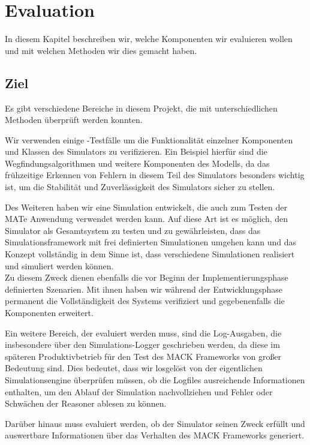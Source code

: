 \chapter{Evaluation}\label{chapter:eval}
In diesem Kapitel beschreiben wir, welche Komponenten wir evaluieren wollen und mit welchen Methoden wir dies gemacht haben.
\section{Ziel}\label{sec:eva_goal}
Es gibt verschiedene Bereiche in diesem Projekt, die mit unterschiedlichen Methoden überprüft werden konnten.

Wir verwenden einige -Testfälle um die Funktionalität einzelner Komponenten und Klassen des Simulators zu verifizieren. Ein Beispiel hierfür sind die Wegfindungsalgorithmen und weitere Komponenten des Modells, da das frühzeitige Erkennen von Fehlern in diesem Teil des Simulators besonders wichtig ist, um die Stabilität und Zuverlässigkeit des Simulators sicher zu stellen.

Des Weiteren haben wir eine Simulation entwickelt, die auch zum Testen der MATe Anwendung verwendet werden kann. Auf diese Art ist es möglich, den Simulator als Gesamtsystem zu testen und zu gewährleisten, dass das Simulationsframework mit frei definierten Simulationen umgehen kann und das Konzept vollständig in dem Sinne ist, dass verschiedene Simulationen realisiert und simuliert werden können.\\
Zu diesem Zweck dienen ebenfalls die vor Beginn der Implementierungsphase definierten Szenarien. Mit ihnen haben wir während der Entwicklungsphase permanent die Vollständigkeit des Systems verifiziert und gegebenenfalls die Komponenten erweitert.

Ein weitere Bereich, der evaluiert werden muss, sind die Log-Ausgaben, die insbesondere über den Simulations-Logger geschrieben werden, da diese im späteren Produktivbetrieb für den Test des MACK Frameworks von großer Bedeutung sind. Dies bedeutet, dass wir losgelöst von der eigentlichen Simulationsengine überprüfen müssen, ob die Logfiles ausreichende Informationen enthalten, um den Ablauf der Simulation nachvollziehen und Fehler oder Schwächen der Reasoner ablesen zu können.

Darüber hinaus muss evaluiert werden, ob der Simulator seinen Zweck erfüllt und auswertbare Informationen über das Verhalten des MACK Frameworks generiert.

